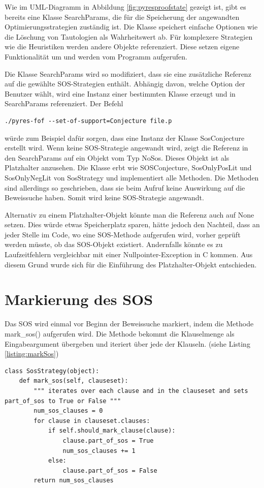 Wie im UML-Diagramm in Abbildung \ref{fig:pyresproofstate} gezeigt ist, gibt es bereits eine Klasse
SearchParams, die für die Speicherung der angewandten Optimierungsstrategien zuständig ist. Die Klasse speichert einfache Optionen wie die Löschung von Tautologien als Wahrheitswert ab. Für komplexere Strategien wie die Heuristiken werden andere Objekte referenziert. Diese setzen eigene Funktionalität um und werden vom Programm aufgerufen.

Die Klasse SearchParams wird so modifiziert, dass sie eine zusätzliche Referenz auf die gewählte SOS-Strategien enthält. Abhängig davon, welche Option der Benutzer wählt, wird eine Instanz einer bestimmten Klasse erzeugt und in SearchParams referenziert. Der Befehl
\begin{lstlisting}
./pyres-fof --set-of-support=Conjecture file.p
\end{lstlisting}
würde zum Beispiel dafür sorgen, dass eine Instanz der Klasse SosConjecture erstellt wird. 
Wenn keine SOS-Strategie angewandt wird, zeigt die Referenz in den SearchParams auf ein Objekt vom Typ NoSos. Dieses Objekt ist als Platzhalter anzusehen. Die Klasse erbt wie SOSConjecture, SosOnlyPosLit und SosOnlyNegLit von SosStrategy und implementiert alle Methoden. Die Methoden sind allerdings so geschrieben, dass sie beim Aufruf keine Auswirkung auf die Beweissuche haben. Somit wird keine SOS-Strategie angewandt.

Alternativ zu einem Platzhalter-Objekt könnte man die Referenz auch auf None setzen. Dies würde etwas Speicherplatz sparen, hätte jedoch den Nachteil, dass an jeder Stelle im Code, wo eine SOS-Methode aufgerufen wird, vorher geprüft werden müsste, ob das SOS-Objekt existiert. Andernfalls könnte es zu Laufzeitfehlern vergleichbar mit einer Nullpointer-Exception in C kommen. Aus diesem Grund wurde sich für die Einführung des Platzhalter-Objekt entschieden.
\section{Markierung des SOS}
\label{section:4.2}

Das SOS wird einmal vor Beginn der Beweissuche markiert, indem die Methode mark\_sos() aufgerufen wird. Die Methode bekommt die Klauselmenge als Eingabeargument übergeben und iteriert über jede der Klauseln. (siehe Listing \ref{listing:markSos})

\begin{lstlisting}[caption={Methode zur Markierung des SOS}, label={listing:markSos}]
class SosStrategy(object):
	def mark_sos(self, clauseset):
		""" iterates over each clause and in the clauseset and sets part_of_sos to True or False """
		num_sos_clauses = 0
		for clause in clauseset.clauses:
			if self.should_mark_clause(clause):
				clause.part_of_sos = True
				num_sos_clauses += 1
			else:
				clause.part_of_sos = False
		return num_sos_clauses
\end{lstlisting}

